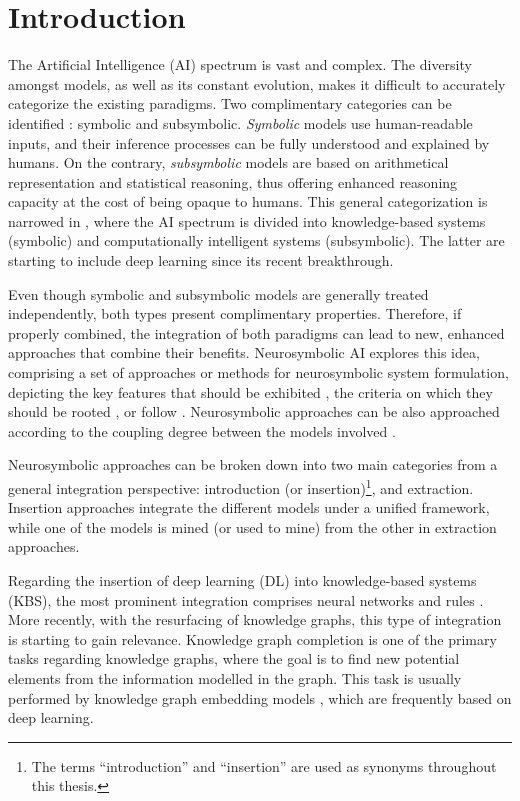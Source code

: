 \chapter{Introduction}
\label{chap:intro}
The Artificial Intelligence (AI) spectrum is vast and complex. The diversity amongst models, as well as its constant evolution, makes it difficult to accurately categorize the existing paradigms. Two complimentary categories can be identified \citep{lieberman_symbolic_nodate}: symbolic and subsymbolic. \textit{Symbolic} models use human-readable inputs, and their inference processes can be fully understood and explained by humans. On the contrary, \textit{subsymbolic} models are based on arithmetical representation and statistical reasoning, thus offering enhanced reasoning capacity at the cost of being opaque to humans. This general categorization is narrowed in \cite{hopgood_2009_knowledge-based}, where the AI spectrum is divided into knowledge-based systems (symbolic) and computationally intelligent systems (subsymbolic). The latter are starting to include deep learning since its recent breakthrough.

Even though symbolic and subsymbolic models are generally treated independently, both types present complimentary properties. Therefore, if properly combined, the integration of both paradigms can lead to new, enhanced approaches that combine their benefits. Neurosymbolic AI explores this idea, comprising a set of approaches or methods for neurosymbolic system formulation, depicting the key features that should be exhibited \citep{mcgarry_hybrid_1999}, the criteria on which they should be rooted \citep{mira_neurosymbolic_2004}, or follow \citep{besold_neural-symbolic_2017}. Neurosymbolic approaches can be also approached according to the coupling degree between the models involved \citep{medsker2020models,hilario_overview_nodate}.

Neurosymbolic approaches can be broken down into two main categories from a general integration perspective: introduction (or insertion)\footnote{The terms ``introduction'' and ``insertion'' are used as synonyms throughout this thesis.}, and extraction. Insertion approaches integrate the different models under a unified framework, while one of the models is mined (or used to mine) from the other in extraction approaches.

Regarding the insertion of deep learning (DL) into knowledge-based systems (KBS), the most prominent integration comprises neural networks and rules \citep{daniele_knowledge_2019,hatzilygeroudis_integrated_2010}. More recently, with the resurfacing of knowledge graphs, this type of integration is starting to gain relevance. Knowledge graph completion \citep{nickel_review_ml_kg_2016,wang_kge_survey_2017,rossi_knowledge_2021} is one of the primary tasks regarding knowledge graphs, where the goal is to find new potential elements from the information modelled in the graph. This task is usually performed by knowledge graph embedding models \citep{transe,distmult,crosse}, which are frequently based on deep learning. 


